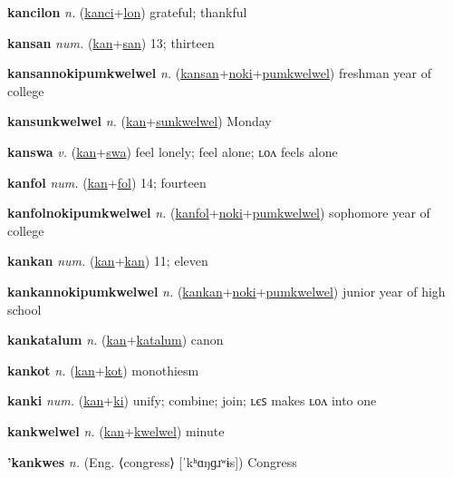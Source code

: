 \textbf{\hypertarget{kancilon}{kancilon}} \textit{n.} (\hyperlink{kanci}{kanci}+\allowbreak \hyperlink{lon}{lon})
grateful; thankful

\textbf{\hypertarget{kansan}{kansan}} \textit{num.} (\hyperlink{kan}{kan}+\allowbreak \hyperlink{san}{san})
13; thirteen

\textbf{\hypertarget{kansannokipumkwelwel}{kansannokipumkwelwel}} \textit{n.} (\hyperlink{kansan}{kansan}+\allowbreak \hyperlink{noki}{noki}+\allowbreak \hyperlink{pumkwelwel}{pumkwelwel})
freshman year of college

\textbf{\hypertarget{kansunkwelwel}{kansunkwelwel}} \textit{n.} (\hyperlink{kan}{kan}+\allowbreak \hyperlink{sunkwelwel}{sunkwelwel})
Monday

\textbf{\hypertarget{kanswa}{kanswa}} \textit{v.} (\hyperlink{kan}{kan}+\allowbreak \hyperlink{swa}{swa})
feel lonely; feel alone; ʟᴏᴧ feels alone

\textbf{\hypertarget{kanfol}{kanfol}} \textit{num.} (\hyperlink{kan}{kan}+\allowbreak \hyperlink{fol}{fol})
14; fourteen

\textbf{\hypertarget{kanfolnokipumkwelwel}{kanfolnokipumkwelwel}} \textit{n.} (\hyperlink{kanfol}{kanfol}+\allowbreak \hyperlink{noki}{noki}+\allowbreak \hyperlink{pumkwelwel}{pumkwelwel})
sophomore year of college

\textbf{\hypertarget{kankan}{kankan}} \textit{num.} (\hyperlink{kan}{kan}+\allowbreak \hyperlink{kan}{kan})
11; eleven

\textbf{\hypertarget{kankannokipumkwelwel}{kankannokipumkwelwel}} \textit{n.} (\hyperlink{kankan}{kankan}+\allowbreak \hyperlink{noki}{noki}+\allowbreak \hyperlink{pumkwelwel}{pumkwelwel})
junior year of high school

\textbf{\hypertarget{kankatalum}{kankatalum}} \textit{n.} (\hyperlink{kan}{kan}+\allowbreak \hyperlink{katalum}{katalum})
canon

\textbf{\hypertarget{kankot}{kankot}} \textit{n.} (\hyperlink{kan}{kan}+\allowbreak \hyperlink{kot}{kot})
monothiesm

\textbf{\hypertarget{kanki}{kanki}} \textit{num.} (\hyperlink{kan}{kan}+\allowbreak \hyperlink{ki}{ki})
unify; combine; join; ʟєꜱ makes ʟᴏᴧ into one

\textbf{\hypertarget{kankwelwel}{kankwelwel}} \textit{n.} (\hyperlink{kan}{kan}+\allowbreak \hyperlink{kwelwel}{kwelwel})
minute

\textbf{\hypertarget{'kankwes}{'kankwes}} \textit{n.} (Eng. ⟨congress⟩ [ˈkʰɑŋɡɹʷɨs])
Congress

